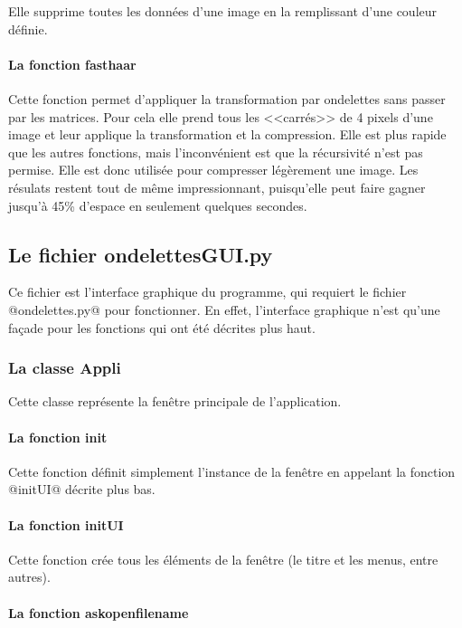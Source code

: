 \documentclass{article}
\begin{document}
Elle supprime toutes les données d'une image en la remplissant d'une couleur définie.

\paragraph{La fonction fasthaar}

Cette fonction permet d'appliquer la transformation par ondelettes sans passer par les matrices. Pour cela elle prend tous les <<carrés>> de 4 pixels d'une image et leur applique la transformation et la compression. Elle est plus rapide que les autres fonctions, mais l'inconvénient est que la récursivité n'est pas permise. Elle est donc utilisée pour compresser légèrement une image. Les résulats restent tout de même impressionnant, puisqu'elle peut faire gagner jusqu'à 45\% d'espace en seulement quelques secondes.



\subsection{Le fichier ondelettesGUI.py}

Ce fichier est l'interface graphique du programme, qui requiert le fichier @ondelettes.py@ pour fonctionner. En effet, l'interface graphique n'est qu'une façade pour les fonctions qui ont été décrites plus haut.

\subsubsection{La classe Appli}

Cette classe représente la fenêtre principale de l'application.

\paragraph{La fonction init}

Cette fonction définit simplement l'instance de la fenêtre en appelant la fonction @initUI@ décrite plus bas.

\paragraph{La fonction initUI}

Cette fonction crée tous les éléments de la fenêtre (le titre et les menus, entre autres).

\paragraph{La fonction askopenfilename}
\end{document}
